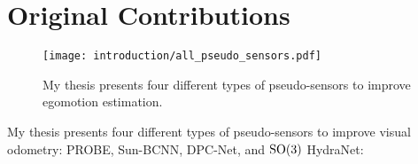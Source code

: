 %
%
% 
 
\section{Original Contributions}

\begin{figure}[h!]
\begin{center}
		\texttt{[image: introduction/all\_pseudo\_sensors.pdf]}
		\caption{My thesis presents four different types of pseudo-sensors to improve egomotion estimation.}
  	\label{fig:intro_pseudo_sensors}
\end{center}
\end{figure}


My thesis presents four different types of pseudo-sensors to improve visual odometry: PROBE, Sun-BCNN, DPC-Net, and $\mathrm{SO}(3)$ HydraNet:

